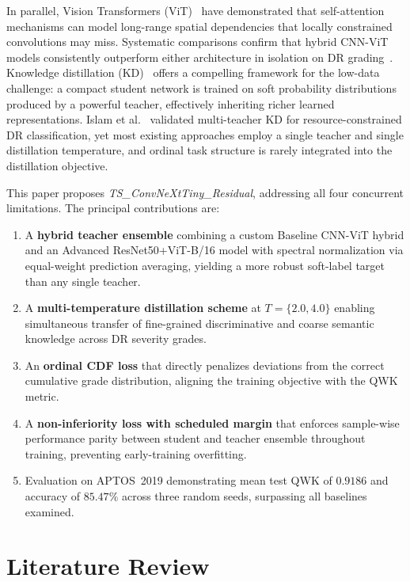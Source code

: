 \documentclass[10pt, twocolumn]{article}
\begin{document}
In parallel, Vision Transformers (ViT)~\cite{dosovitskiy2021} have demonstrated
that self-attention mechanisms can model long-range spatial dependencies that
locally constrained convolutions may miss. Systematic comparisons confirm that
hybrid CNN-ViT models consistently outperform either architecture in isolation on DR
grading~\cite{zhang2025}. Knowledge distillation (KD)~\cite{hinton2015} offers a
compelling framework for the low-data challenge: a compact student network is
trained on soft probability distributions produced by a powerful teacher,
effectively inheriting richer learned representations. Islam et
al.~\cite{islam2023} validated multi-teacher KD for resource-constrained DR
classification, yet most existing approaches employ a single teacher and single
distillation temperature, and ordinal task structure is rarely integrated into the
distillation objective.

This paper proposes \textit{TS\_ConvNeXtTiny\_Residual}, addressing all four
concurrent limitations. The principal contributions are:
\begin{enumerate}
  \item A \textbf{hybrid teacher ensemble} combining a custom Baseline CNN-ViT
  hybrid and an Advanced ResNet50+ViT-B/16 model with spectral normalization via
  equal-weight prediction averaging, yielding a more robust soft-label target than
  any single teacher.
  \item A \textbf{multi-temperature distillation scheme} at $T = \{2.0, 4.0\}$
  enabling simultaneous transfer of fine-grained discriminative and coarse semantic
  knowledge across DR severity grades.
  \item An \textbf{ordinal CDF loss} that directly penalizes deviations from the
  correct cumulative grade distribution, aligning the training objective with the
  QWK metric.
  \item A \textbf{non-inferiority loss with scheduled margin} that enforces
  sample-wise performance parity between student and teacher ensemble throughout
  training, preventing early-training overfitting.
  \item Evaluation on APTOS~2019 demonstrating mean test QWK of $\mathbf{0.9186}$
  and accuracy of $\mathbf{85.47\%}$ across three random seeds, surpassing all
  baselines examined.
\end{enumerate}

\section{Literature Review}
\end{document}
